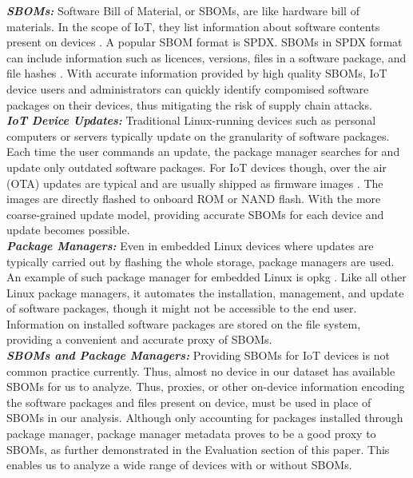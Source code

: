 \textbf{\textit{SBOMs:}} Software Bill of Material, or SBOMs, are like hardware bill of materials. In the scope of IoT, they list information about software contents present on devices \cite{What_is_a_sbom}. A popular SBOM format is SPDX. SBOMs in SPDX format can include information such as licences, versions, files in a software package, and file hashes \cite{SPDX_Spec}. With accurate information provided by high quality SBOMs, IoT device users and administrators can quickly identify compomised software packages on their devices, thus mitigating the risk of supply chain attacks. \\
\textbf{\textit{IoT Device Updates:}} Traditional Linux-running devices such as personal computers or servers typically update on the granularity of software packages. Each time the user commands an update, the package manager searches for and update only outdated software packages. For IoT devices though, over the air (OTA) updates are typical and are usually shipped as firmware images \cite{A_study_of_ota}. The images are directly flashed to onboard ROM or NAND flash. With the more coarse-grained update model, providing accurate SBOMs for each device and update becomes possible. \\
\textbf{\textit{Package Managers:}} Even in embedded Linux devices where updates are typically carried out by
flashing the whole storage, package managers are used. An example of such
package manager for embedded Linux is opkg \cite{opkg}. Like all other Linux
package managers, it automates the installation, management, and update of
software packages, though it might not be accessible to the end user.
Information on installed software packages are stored on the file system,
providing a convenient and accurate proxy of SBOMs. \\
\textbf{\textit{SBOMs and Package Managers:}} Providing SBOMs for IoT devices is not
common practice currently. Thus, almost no device in our dataset has available SBOMs for
us to analyze. Thus, proxies, or other on-device information encoding the
software packages and files present on device, must be used in place of SBOMs
in our analysis. Although only accounting for packages installed through
package manager, package manager metadata proves to be a good proxy to SBOMs, as further demonstrated
in the Evaluation section of this paper. This enables us to analyze a wide
range of devices with or without SBOMs.
